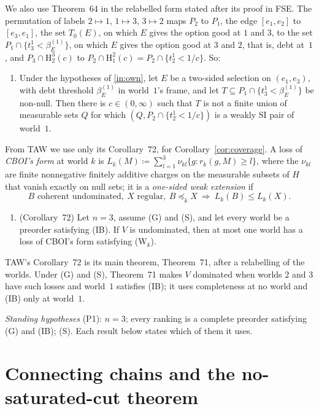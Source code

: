 \documentclass[11pt]{article}
\theoremstyle{definition}\newtheorem{definition}[theorem]{Definition}
\theoremstyle{remark}\newtheorem{remark}[theorem]{Remark}
\newcommand{\Hi}[3]{\mathrm H^{#1}_{#2}(#3)}
\begin{document}
We also use Theorem~64 in the relabelled form stated after its proof in
FSE. The permutation of labels $2\mapsto1$, $1\mapsto3$, $3\mapsto2$ maps
$P_2$ to $P_1$, the edge $[e_1,e_2]$ to $[e_3,e_1]$, the set $T_0(E)$, on
which $E$ gives the option good at $1$ and $3$, to the set
$P_1\cap\{t^1_3<\beta^{(1)}_E\}$, on which $E$ gives the option good at $3$
and $2$, that is, debt at~$1$, and $P_3\cap\Hi32c$ to
$P_2\cap\Hi21c=P_2\cap\{t^1_2<1/c\}$. So:
\begin{enumerate}[label=(F\arabic*$'$),leftmargin=*,start=6]
\item\label{in:ownrel} Under the hypotheses of \ref{in:own}, let $E$ be a
two-sided selection on $(e_1,e_3)$, with debt threshold $\beta^{(1)}_E$ in
world~$1$'s frame, and let $T\subseteq P_1\cap\{t^1_3<\beta^{(1)}_E\}$ be
non-null. Then there is $c\in(0,\infty)$ such that $T$ is not a finite union
of measurable sets $Q$ for which $(Q,P_2\cap\{t^1_2<1/c\})$ is a weakly SI
pair of world~$1$.
\end{enumerate}
From TAW we use only its Corollary~72, for Corollary~\ref{cor:coverage}. A
loss of \emph{CBOI's form} at world $k$ is
$L_k(M)\coloneqq\sum_{l=1}^3\nu_{kl}\{g:r_k(g,M)\ge l\}$, where the
$\nu_{kl}$ are finite nonnegative finitely additive charges on the
measurable subsets of $H$ that vanish exactly on null sets; it is a
\emph{one-sided weak extension} if
\[
 B\text{ coherent undominated},\ X\text{ regular},\ B\preceq_kX
 \ \Longrightarrow\ L_k(B)\le L_k(X).
 \tag{W$_k$}
\]
\begin{enumerate}[label=(TAW),leftmargin=*]
\item (Corollary~72) Let $n=3$, assume (G) and (S), and let every world be a
preorder satisfying (IB). If $V$ is undominated, then at most one world has
a loss of CBOI's form satisfying (W$_k$).
\end{enumerate}
TAW's Corollary~72 is its main theorem, Theorem~71, after a relabelling of
the worlds. Under (G) and (S), Theorem~71 makes $V$ dominated when worlds
$2$ and $3$ have such losses and world~$1$ satisfies (IB); it uses completeness at no world and
(IB) only at world~$1$.

\emph{Standing hypotheses} (P1): $n=3$; every ranking is a complete preorder
satisfying (G) and (IB); (S). Each result below states which of them it
uses.

\section{Connecting chains and the no-saturated-cut theorem}\label{sec:chains}
\end{document}
